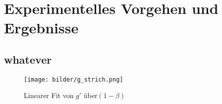 \section{Experimentelles Vorgehen und Ergebnisse}
\subsection{whatever}


\begin{figure}[]
  \centering
  \texttt{[image: bilder/g\_strich.png]}
  \caption{Linearer Fit von $g'$ über$(1-\beta)$}
  \label{fig:abbe}
\end{figure}


